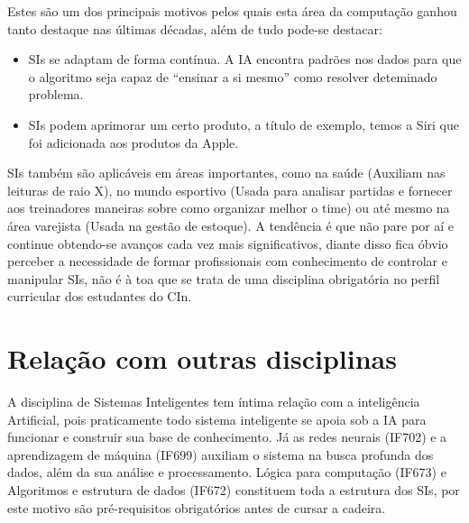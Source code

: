 \documentclass[10pt]{paper}
\begin{document}
Estes são um dos principais motivos pelos quais esta área da computação ganhou tanto destaque nas últimas décadas, além de tudo pode-se destacar:


\begin{itemize}
    \item SIs se adaptam de forma contínua. A IA encontra padrões nos dados para que o algoritmo seja capaz de “ensinar a si mesmo” como resolver deteminado problema.\cite{wikipedia_2019}
    
    \item SIs podem aprimorar um certo produto, a título de exemplo, temos a Siri que foi adicionada aos produtos da Apple.
\end{itemize}

SIs também são aplicáveis em áreas importantes, como na saúde (Auxiliam nas leituras de raio X), no mundo esportivo (Usada para analisar partidas e fornecer aos treinadores maneiras sobre como organizar melhor o time) ou até mesmo na área varejista (Usada na gestão de estoque). A tendência é que não pare por aí e continue obtendo-se avanços cada vez mais significativos, diante disso fica óbvio perceber a necessidade de formar profissionais com conhecimento de controlar e manipular SIs, não é à toa que se trata de uma disciplina obrigatória no perfil curricular dos estudantes do CIn.\cite{michels_2018}\cite{sas}

\section{Relação com outras disciplinas}
A disciplina de Sistemas Inteligentes tem íntima relação com a inteligência Artificial, pois praticamente todo sistema inteligente se apoia sob a IA para funcionar e construir sua base de conhecimento. Já as redes neurais (IF702) e a aprendizagem de máquina (IF699) auxiliam o sistema na busca profunda dos dados, além da sua análise e processamento. Lógica para computação (IF673) e Algoritmos e estrutura de dados (IF672) constituem toda a estrutura dos SIs, por este motivo são pré-requisitos obrigatórios antes de cursar a cadeira.



\end{document}
